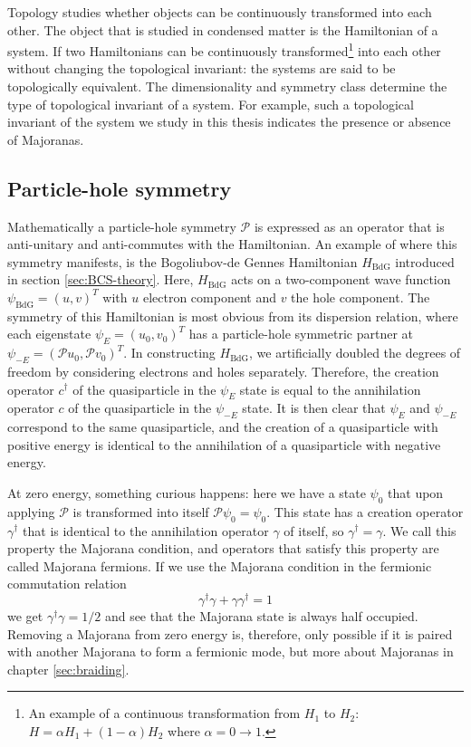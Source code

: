 Topology studies whether objects can be continuously transformed into each other.
The object that is studied in condensed matter is the Hamiltonian of a system.
If two Hamiltonians can be continuously transformed\footnote{An example of a continuous transformation from $H_{1}$ to $H_{2}$: $H=\alpha H_{1}+(1-\alpha)H_{2}$ where $\alpha=0\rightarrow1$.} into each other without changing the topological invariant: the systems are said to be topologically equivalent.
The dimensionality and symmetry class determine the type of topological invariant of a system.
For example, such a topological invariant of the system we study in this thesis indicates the presence or absence of Majoranas.

\subsection{Particle-hole symmetry\label{sec:phs}}

Mathematically a particle-hole symmetry $\mathcal{P}$ is expressed as an operator that is anti-unitary and anti-commutes with the Hamiltonian.
An example of where this symmetry manifests, is the Bogoliubov-de Gennes Hamiltonian $H_{\textrm{BdG}}$ introduced in section \ref{sec:BCS-theory}.
Here, $H_{\textrm{BdG}}$ acts on a two-component wave function $\psi_{\textrm{BdG}}=\left(u,v\right)^{T}$ with $u$ electron component and $v$ the hole component.
The symmetry of this Hamiltonian is most obvious from its dispersion relation, where each eigenstate $\psi_{E}=\left(u_{0},v_{0}\right)^{T}$ has a particle-hole symmetric partner at $\psi_{-E}=\left(\mathcal{P}u_{0},\mathcal{P}v_{0}\right)^{T}$.
In constructing $H_{\textrm{BdG}}$, we artificially doubled the degrees of freedom by considering electrons and holes separately.
Therefore, the creation operator $c^{\dagger}$ of the quasiparticle in the $\psi_{E}$ state is equal to the annihilation operator $c$ of the quasiparticle in the $\psi_{-E}$ state.
It is then clear that $\psi_{E}$ and $\psi_{-E}$ correspond to the same quasiparticle, and the creation of a quasiparticle with positive energy is identical to the annihilation of a quasiparticle with negative energy.

At zero energy, something curious happens: here we have a state $\psi_{0}$ that upon applying $\mathcal{P}$ is transformed into itself $\mathcal{P}\psi_{0}=\psi_{0}$.
This state has a creation operator $\gamma^{\dagger}$ that is identical to the annihilation operator $\gamma$ of itself, so $\gamma^{\dagger}=\gamma$.
We call this property the Majorana condition, and operators that satisfy this property are called Majorana fermions.
If we use the Majorana condition in the fermionic commutation relation
\[
\gamma^{\dagger}\gamma+\gamma\gamma^{\dagger}=1
\]
we get $\gamma^{\dagger}\gamma=1/2$ and see that the Majorana state is always half occupied.
Removing a Majorana from zero energy is, therefore, only possible if it is paired with another Majorana to form a fermionic mode, but more about Majoranas in chapter \ref{sec:braiding}.

